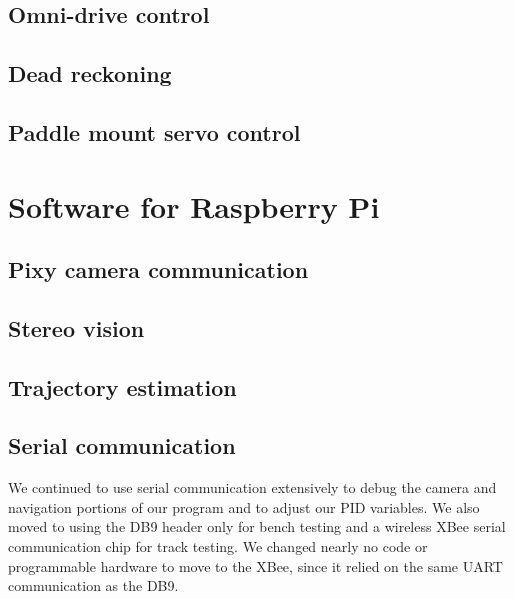 \documentclass[letterpaper, 11pt]{article}
\begin{document}
\begin{enumerate}[label=\textbf{\arabic*.}]
\subsection{Omni-drive control}

\subsection{Dead reckoning}

\subsection{Paddle mount servo control}

\section{Software for Raspberry Pi}
\subsection{Pixy camera communication}

\subsection{Stereo vision}

\subsection{Trajectory estimation}

\subsection{Serial communication}
We continued to use serial communication extensively to debug the camera and navigation portions of our program and to adjust our PID variables. We also moved to using the DB9 header only for bench testing and a wireless XBee serial communication chip for track testing. We changed nearly no code or programmable hardware to move to the XBee, since it relied on the same UART communication as the DB9.


\end{enumerate}
\end{document}
